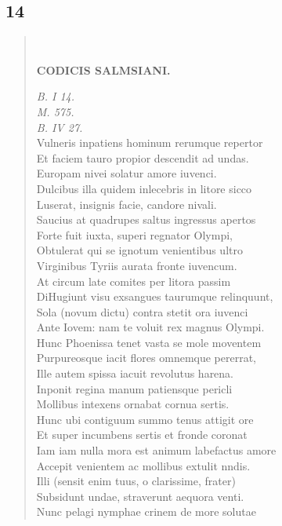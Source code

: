 \documentclass[11pt, a4paper]{report}
\begin{document}
            \subsection*{14}
      \begin{verse}
      
        ﻿\pagebreak 
    \begin{center} \textbf{CODICIS SALMSIANI.} \end{center} \marginpar{[49]} \textit{B. I 14.} \\ \textit{M. 575.} \\ \textit{B. IV 27.} \\ Vulneris inpatiens hominum rerumque repertor \\ Et faciem tauro propior descendit ad undas. \\ Europam nivei solatur amore iuvenci. \\ Dulcibus illa quidem inlecebris in litore sicco \\ Luserat, insignis facie, candore nivali. \\ Saucius at quadrupes saltus ingressus apertos \\ Forte fuit iuxta, superi regnator Olympi, \\ Obtulerat qui se ignotum venientibus ultro \\ Virginibus Tyriis aurata fronte iuvencum. \\ At circum late comites per litora passim \\ DiHugiunt visu exsangues taurumque relinquunt, \\ Sola (novum dictu) contra stetit ora iuvenci \\ Ante Iovem: nam te voluit rex magnus Olympi. \\ Hunc Phoenissa tenet vasta se mole moventem \\ Purpureosque iacit flores omnemque pererrat, \\ Ille autem spissa iacuit revolutus harena. \\ Inponit regina manum patiensque pericli \\ Mollibus intexens ornabat cornua sertis. \\ Hunc ubi contiguum summo tenus attigit ore \\ Et super incumbens sertis et fronde coronat \\ Iam iam nulla mora est animum labefactus amore \\ Accepit venientem ac mollibus extulit nndis. \\ Illi (sensit enim tuus, o clarissime, frater) \\ Subsidunt undae, straverunt aequora venti. \\ Nunc pelagi nymphae crinem de more solutae \\ 

\end{verse}
\end{document}
